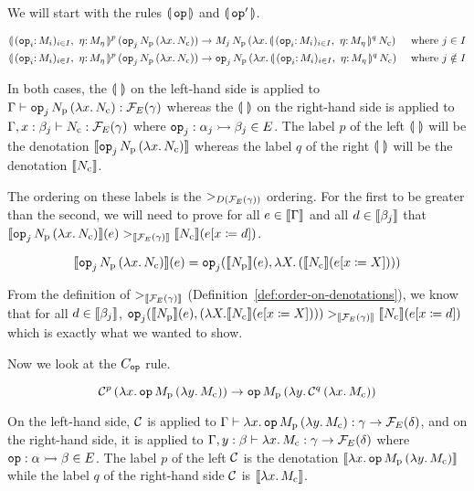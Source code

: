 We will start with the rules $\llparenthesis \, \mathtt{op} \, \rrparenthesis$ and $\llparenthesis \, \mathtt{op}' \, \rrparenthesis$.

\begin{align*}
  \ap{\cibanana^p}{(\ap{\ap{\op{op}_j}{N_{\mathrm{p}}}}{(\lam{x}{N_{\mathrm{c}}})})}
  & \to \ap{M_j}{\ap{N_{\mathrm{p}}}{(\lam{x}{\ap{\cibanana^q}{N_{\mathrm{c}}}})}}
  & \text{ where $j \in I$} \\
  \ap{\cibanana^p}{(\ap{\ap{\op{op}_j}{N_{\mathrm{p}}}}{(\lam{x}{N_{\mathrm{c}}})})}
  &\to \ap{\op{op}_j}{\ap{N_{\mathrm{p}}}{(\lam{x}{\ap{\cibanana^q}{N_{\mathrm{c}}}})}}
  & \text{ where $j \notin I$}
\end{align*}

In both cases, the $\llparenthesis \,  \, \rrparenthesis$ on the left-hand side is applied to
$\Gamma \vdash \mathtt{op}_j\,N_{\mathrm{p}}\,(\lambda x.\, N_{\mathrm{c}}) :
\mathcal{F}_E(\gamma)$ whereas the $\llparenthesis \,  \, \rrparenthesis$ on the right-hand side is applied to
$\Gamma, x : \beta_j \vdash N_{\mathrm{c}} : \mathcal{F}_E(\gamma)$ where
$\mathtt{op}_j : \alpha_j \rightarrowtail \beta_j \in E$. The label $p$ of the left
$\llparenthesis \,  \, \rrparenthesis$ will be the denotation
$\llbracket \mathtt{op}_j\,N_{\mathrm{p}}\,(\lambda x.\, N_{\mathrm{c}}) \rrbracket$ whereas the label
$q$ of the right $\llparenthesis \,  \, \rrparenthesis$ will be the denotation $\llbracket N_{\mathrm{c}} \rrbracket$.

The ordering on these labels is the $>_{D(\mathcal{F}_E(\gamma))}$ ordering. For
the first to be greater than the second, we will need to prove for all
$e \in \llbracket \Gamma \rrbracket$ and all $d \in \llbracket \beta_j \rrbracket$ that
$\llbracket \mathtt{op}_j\,N_{\mathrm{p}}\,(\lambda x.\, N_{\mathrm{c}}) \rrbracket(e)
>_{\llbracket \mathcal{F}_E(\gamma) \rrbracket} \llbracket N_{\mathrm{c}} \rrbracket(e[x \coloneqq d])$.

$$
\llbracket \mathtt{op}_j\,N_{\mathrm{p}}\,(\lambda x.\, N_{\mathrm{c}}) \rrbracket(e) =
\mathtt{op}_j(\llbracket N_{\mathrm{p}} \rrbracket(e), \lambda X.\, ({\llbracket N_{\mathrm{c}} \rrbracket}(e[x \coloneqq X])))
$$

From the definition of $>_{\llbracket \mathcal{F}_E(\gamma) \rrbracket}$
(Definition~\ref{def:order-on-denotations}), we know that for all
$d \in \llbracket \beta_j \rrbracket$,
$\mathtt{op}_j(\llbracket N_{\mathrm{p}} \rrbracket(e), (\lambda X.\, \\{\llbracket N_{\mathrm{c}} \rrbracket(e[x \coloneqq X])}))
>_{\llbracket \mathcal{F}_E(\gamma) \rrbracket} \llbracket N_{\mathrm{c}} \rrbracket(e[x \coloneqq d])$ which is exactly
what we wanted to show.

Now we look at the $C_{\mathtt{op}}$ rule.

$$
\mathcal{C}^p\,(\lambda x.\, \mathtt{op}\,M_{\mathrm{p}}\,(\lambda y.\, M_{\mathrm{c}}))
\to \mathtt{op}\,M_{\mathrm{p}}\,(\lambda y.\, \mathcal{C}^q\,(\lambda x.\, M_{\mathrm{c}}))
$$

On the left-hand side, $\mathcal{C}$ is applied to
$\Gamma \vdash \lambda x.\, \mathtt{op}\,M_{\mathrm{p}}\,(\lambda y.\, M_{\mathrm{c}}) :
\gamma \to \mathcal{F}_E(\delta)$, and on the right-hand side, it is applied to
$\Gamma, y : \beta \vdash \lambda x.\, M_{\mathrm{c}} : \gamma \to \mathcal{F}_E(\delta)$
where $\mathtt{op} : \alpha \rightarrowtail \beta \in E$. The label $p$ of the left $\mathcal{C}$
is the denotation
$\llbracket \lambda x.\, \mathtt{op}\,M_{\mathrm{p}}\,(\lambda y.\, M_{\mathrm{c}}) \rrbracket$ while the
label $q$ of the right-hand side $\mathcal{C}$ is $\llbracket \lambda x.\, M_{\mathrm{c}} \rrbracket$.


